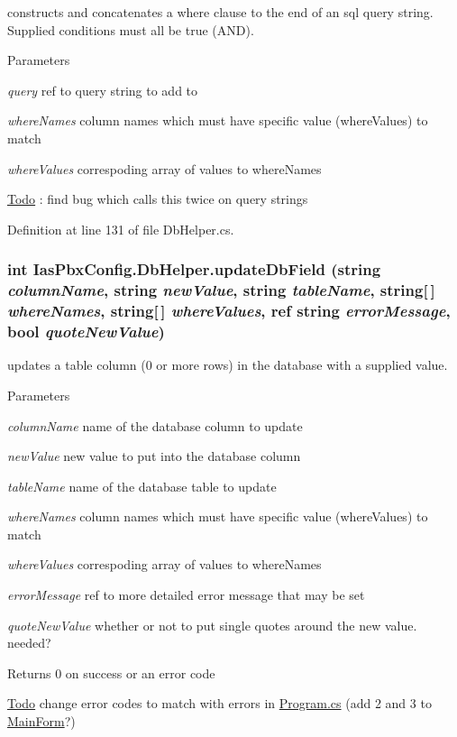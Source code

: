 constructs and concatenates a where clause to the end of an sql query string. Supplied conditions must all be true (AND). 
\begin{DoxyParams}{Parameters}
\item[{\em query}]ref to query string to add to \item[{\em whereNames}]column names which must have specific value (whereValues) to match \item[{\em whereValues}]correspoding array of values to whereNames \end{DoxyParams}
\begin{Desc}
\item[\hyperlink{todo__todo000015}{Todo}]: find bug which calls this twice on query strings \end{Desc}


Definition at line 131 of file DbHelper.cs.\hypertarget{class_ias_pbx_config_1_1_db_helper_affab755fb8424c45031cb8d7736799e1}{
\subsubsection[{updateDbField}]{\setlength{\rightskip}{0pt plus 5cm}int IasPbxConfig.DbHelper.updateDbField (string {\em columnName}, \/  string {\em newValue}, \/  string {\em tableName}, \/  string\mbox{[}$\,$\mbox{]} {\em whereNames}, \/  string\mbox{[}$\,$\mbox{]} {\em whereValues}, \/  ref string {\em errorMessage}, \/  bool {\em quoteNewValue})}}
\label{class_ias_pbx_config_1_1_db_helper_affab755fb8424c45031cb8d7736799e1}


updates a table column (0 or more rows) in the database with a supplied value. 
\begin{DoxyParams}{Parameters}
\item[{\em columnName}]name of the database column to update \item[{\em newValue}]new value to put into the database column \item[{\em tableName}]name of the database table to update \item[{\em whereNames}]column names which must have specific value (whereValues) to match \item[{\em whereValues}]correspoding array of values to whereNames \item[{\em errorMessage}]ref to more detailed error message that may be set \item[{\em quoteNewValue}]whether or not to put single quotes around the new value. needed? \end{DoxyParams}
\begin{DoxyReturn}{Returns}
0 on success or an error code 
\end{DoxyReturn}
\begin{Desc}
\item[\hyperlink{todo__todo000018}{Todo}]change error codes to match with errors in \hyperlink{_program_8cs}{Program.cs} (add 2 and 3 to \hyperlink{class_ias_pbx_config_1_1_main_form}{MainForm}?) \end{Desc}


